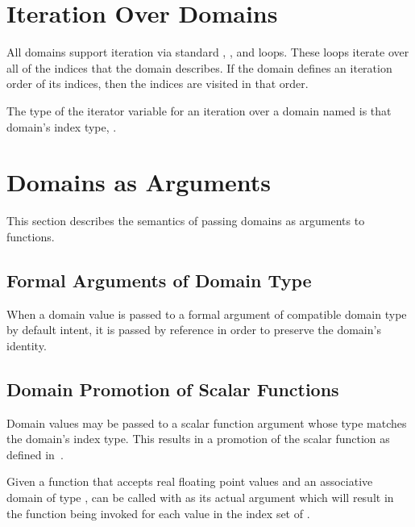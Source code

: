 \section{Iteration Over Domains}
\label{Iteration_over_Domains}

All domains support iteration via standard , , and 
loops.  These loops iterate over all of the indices that the domain
describes.  If the domain defines an iteration order of its indices,
then the indices are visited in that order.  

The type of the iterator variable for an iteration over a
domain named  is that domain's index type, .


\section{Domains as Arguments}
\label{Domain_Arguments}

This section describes the semantics of passing domains as arguments
to functions.

\subsection{Formal Arguments of Domain Type}

When a domain value is passed to a formal argument of compatible
domain type by default intent, it is passed by reference in order to
preserve the domain's identity.

\subsection{Domain Promotion of Scalar Functions}
\label{Domain_Promotion_of_Scalar_Functions}

Domain values may be passed to a scalar function argument whose type
matches the domain's index type.  This results in a promotion of the
scalar function as defined in~.

\begin{example}
Given a function  that accepts real floating point values
and an associative domain  of
type ,  can be called with  as
its actual argument which will result in the function being invoked
for each value in the index set of .
\end{example}


